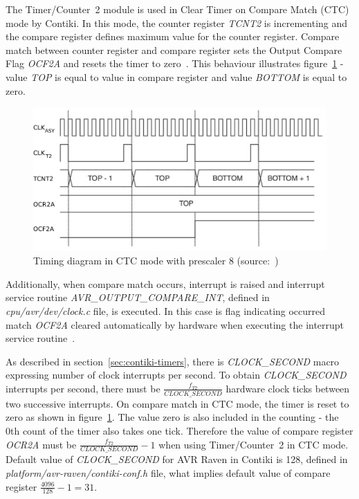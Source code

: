 The Timer/Counter~2 module is used in Clear Timer on Compare Match (CTC) mode by Contiki.
In this mode, the counter register {\it{TCNT2}} is incrementing
and the compare register defines maximum value for the counter register.
Compare match between counter register and compare register
sets the Output Compare Flag {\it{OCF2A}} and resets the timer to zero~\cite{avr-datasheet}.
This behaviour illustrates figure~\ref{fig:design-timing-diagram}
- value {\it{TOP}} is equal to value in compare register and value {\it{BOTTOM}} is equal to zero.

\begin{figure}
  \centering
  \includegraphics[width=12cm,keepaspectratio]{fig/timing-diagram.pdf}
  \caption{Timing diagram in CTC mode with prescaler 8 (source:~\cite{avr-datasheet})}
  \label{fig:design-timing-diagram}
  \bigskip
\end{figure}

Additionally, when compare match occurs,
interrupt is raised and interrupt service routine {\it{AVR\_OUTPUT\_COMPARE\_INT}},
defined in {\it{cpu/avr/dev/clock.c}} file, is executed.
In this case is flag indicating occurred match {\it{OCF2A}}
cleared automatically by hardware when executing
the interrupt service routine~\cite{avr-datasheet}.

As described in section~\ref{sec:contiki-timers}, there is
{\it{CLOCK\_SECOND}} macro expressing number of clock interrupts per second.
To obtain {\it{CLOCK\_SECOND}} interrupts per second, there must be
${\frac{f_{T2}}{CLOCK\_SECOND}}$ hardware clock ticks between two successive interrupts.
On compare match in CTC mode, the timer is reset to zero as
shown in figure~\ref{fig:design-timing-diagram}.
The value zero is also included in the counting - the 0th count of the timer also takes one tick.
Therefore the value of compare register {\it{OCR2A}} must be ${\frac{f_{T2}}{CLOCK\_SECOND}} - 1$
when using Timer/Counter~2 in CTC mode.
Default value of {\it{CLOCK\_SECOND}} for AVR Raven in Contiki is 128,
defined in {\it{platform/avr-raven/contiki-conf.h}} file,
what implies default value of compare register ${\frac{4096}{128}} - 1 = 31$.

